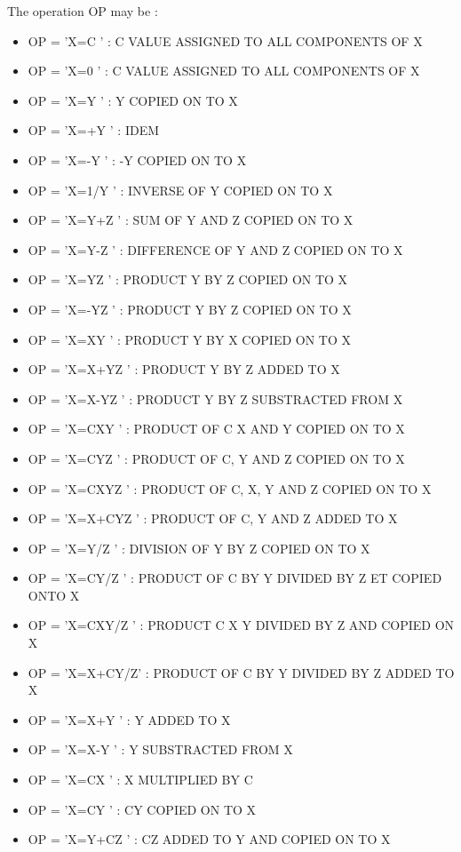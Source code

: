 The operation OP may be :
\begin{itemize}
  \item OP = 'X=C     ' :  C VALUE ASSIGNED TO ALL COMPONENTS OF X
  \item OP = 'X=0     ' :  C VALUE ASSIGNED TO ALL COMPONENTS OF X
  \item OP = 'X=Y     ' :  Y COPIED ON TO X
  \item OP = 'X=+Y    ' :  IDEM
  \item OP = 'X=-Y    ' : -Y COPIED ON TO X
  \item OP = 'X=1/Y   ' :  INVERSE OF Y COPIED ON TO X
  \item OP = 'X=Y+Z   ' :  SUM OF Y AND Z COPIED ON TO X
  \item OP = 'X=Y-Z   ' :  DIFFERENCE OF Y AND Z COPIED ON TO X
  \item OP = 'X=YZ    ' :  PRODUCT Y BY Z COPIED ON TO X
  \item OP = 'X=-YZ   ' :  PRODUCT Y BY Z COPIED ON TO X
  \item OP = 'X=XY    ' :  PRODUCT Y BY X COPIED ON TO X
  \item OP = 'X=X+YZ  ' :  PRODUCT Y BY Z ADDED TO X
  \item OP = 'X=X-YZ  ' :  PRODUCT Y BY Z SUBSTRACTED FROM X
  \item OP = 'X=CXY   ' :  PRODUCT OF C X AND Y COPIED ON TO X
  \item OP = 'X=CYZ   ' :  PRODUCT OF C, Y AND Z COPIED ON TO X
  \item OP = 'X=CXYZ  ' :  PRODUCT OF C, X, Y AND Z COPIED ON TO X
  \item OP = 'X=X+CYZ ' :  PRODUCT OF C, Y AND Z ADDED TO X
  \item OP = 'X=Y/Z   ' :  DIVISION OF Y BY Z COPIED ON TO X
  \item OP = 'X=CY/Z  ' :  PRODUCT OF C BY Y DIVIDED BY Z ET COPIED ONTO X
  \item OP = 'X=CXY/Z ' :  PRODUCT C X Y DIVIDED BY Z AND COPIED ON X
  \item OP = 'X=X+CY/Z' :  PRODUCT OF C BY Y DIVIDED BY Z ADDED TO X
  \item OP = 'X=X+Y   ' :  Y ADDED TO X
  \item OP = 'X=X-Y   ' :  Y SUBSTRACTED FROM X
  \item OP = 'X=CX    ' :  X MULTIPLIED BY C
  \item OP = 'X=CY    ' :  CY COPIED ON TO X
  \item OP = 'X=Y+CZ  ' :  CZ ADDED TO Y AND COPIED ON TO X

\end{itemize}
